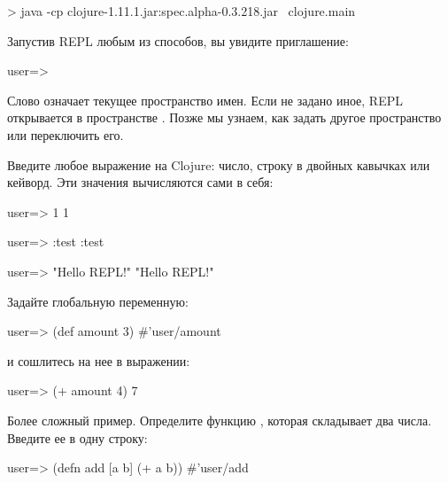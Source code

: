 \begin{english}
  \begin{bash}
> java -cp clojure-1.11.1.jar:spec.alpha-0.3.218.jar \
       clojure.main
  \end{bash}
\end{english}

Запустив REPL любым из способов, вы увидите приглашение:

\begin{english}
  \begin{text}
user=>
  \end{text}
\end{english}

Слово  означает текущее пространство имен. Если не задано иное, REPL открывается в пространстве . Позже мы узнаем, как задать другое пространство или переключить его.

Введите любое выражение на Clojure: число, строку в двойных кавычках или кейворд. Эти значения вычисляются сами в себя:

\begin{english}
  \begin{clojure}
user=> 1
1

user=> :test
:test

user=> "Hello REPL!"
"Hello REPL!"
  \end{clojure}
\end{english}

Задайте глобальную переменную:

\begin{english}
  \begin{clojure}
user=> (def amount 3)
#'user/amount
  \end{clojure}
\end{english}

\noindent
и сошлитесь на нее в выражении:

\begin{english}
  \begin{clojure}
user=> (+ amount 4)
7
  \end{clojure}
\end{english}

Более сложный пример. Определите функцию , которая складывает два числа. Введите ее в одну строку:

\begin{english}
  \begin{clojure}
user=> (defn add [a b] (+ a b))
#'user/add
  \end{clojure}
\end{english}

